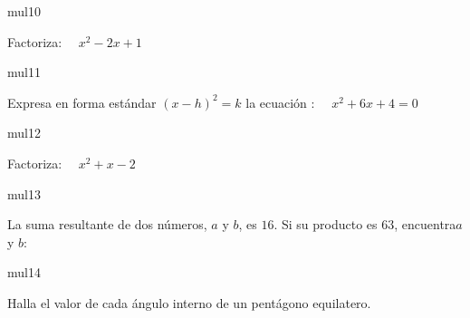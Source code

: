 \documentclass[a4paper]{article}
\begin{document}
\begin{question}{mul10}

            Factoriza:  \ \ \(x^2 -2x +1 \)
        \begin{choices}
        \end{choices}
         
\end{question}

\begin{question}{mul11}

        Expresa en forma estándar \((x-h)^2 = k\) la ecuación : \ \ \(x^2 + 6x +4 = 0\)
        
 \begin{choices}
\end{choices}
        
\end{question}

\begin{question}{mul12}
         
            Factoriza:  \ \ \(x^2+x -2 \)
        \begin{choices}
        \end{choices}
        
\end{question}

\begin{question}{mul13}

La suma resultante de dos números, \(a\) y \(b\), es \(16\). Si su producto es \(63\), encuentra\(a\) y \(b\):

    \begin{choices}
    \end{choices}
\end{question}

\begin{question}{mul14}

 Halla el valor de cada ángulo interno de un pentágono equilatero.
 
        \begin{choices}
        \end{choices}

\end{question}
\end{document}
